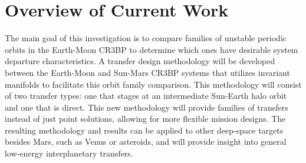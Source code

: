 \section{Overview of Current Work}
The main goal of this investigation is to compare families of unstable periodic orbits in the
Earth-Moon CR3BP to determine which ones have desirable system departure characteristics. A
transfer design methodology will be developed between the Earth-Moon and Sun-Mars CR3BP systems
that utilizes invariant manifolds to facilitate this orbit family comparison. This methodology will
consist of two transfer types: one that stages at an intermediate Sun-Earth halo orbit and one that
is direct. This new methodology will provide families of transfers instead of just point solutions,
allowing for more flexible mission designs. The resulting methodology and results can be applied to
other deep-space targets besides Mars, such as Venus or asteroids, and will provide insight into
general low-energy interplanetary transfers.

